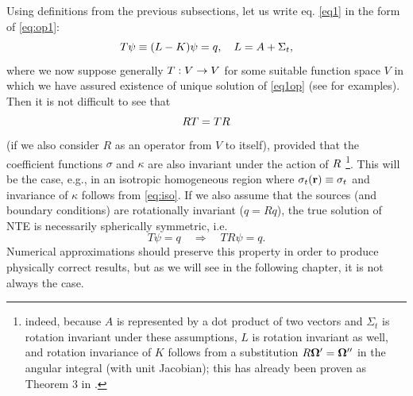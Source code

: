Using definitions from the previous subsections, let us write eq. \eqref{eq1} in the form of \eqref{eq:op1}:
\begin{equation}\label{eq1op}
	T\psi \equiv (L - K)\psi = q,\quad L = A + \Sigma_t,
\end{equation} 
where we now suppose generally $T:V\to V$ for some suitable function space $V$ in which we have assured existence
of unique solution of \eqref{eq1op} (see  for examples). Then it is not difficult to see that
\begin{equation}\label{eq:commut_NTE}
	RT = TR
\end{equation}
(if we also consider $R$ as an operator from $V$ to itself),
provided that the coefficient functions $\sigma$ and $\kappa$ are also invariant under the action of $R$ \footnote{
indeed, because $A$ is represented by a dot product of two vectors and $\Sigma_t$ is rotation invariant under these
assumptions, $L$ is rotation invariant as well, and rotation invariance of $K$ follows from a substitution $R\mathbf{\Omega}' = \mathbf{\Omega}''$ in the
angular integral (with unit Jacobian); this has already been proven as Theorem 3 in \cite{Zweifel}.}.
This will be the case, e.g., in an isotropic homogeneous region where  $\sigma_t(\mathbf{r}) \equiv \sigma_t$ and invariance of
$\kappa$ follows from \eqref{eq:iso}. If we also assume that the sources (and
boundary conditions) are  rotationally invariant ($q = Rq$), the true solution of NTE is necessarily
spherically symmetric, i.e. 
$$
T\psi = q \quad \Rightarrow \quad TR\psi = q.
$$
Numerical approximations should preserve this property in order to produce physically correct results, but as we will
see in the following chapter, it is not always the case.
